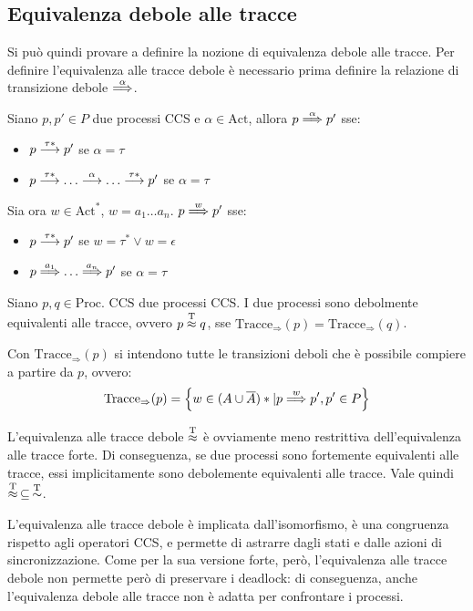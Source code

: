 \subsection*{Equivalenza debole alle tracce}
Si può quindi provare a definire la nozione di equivalenza debole alle tracce.
Per definire l'equivalenza alle tracce debole è necessario prima definire
la relazione di transizione debole $\overset{\alpha}{\Longrightarrow}$.
\begin{defn}
    Siano $p, p' \in P$ due processi CCS e $\alpha \in \text{Act}$,
    allora $p \overset{\alpha}{\Longrightarrow} p'$ sse:
    \begin{itemize}
        \item $p \overset{\tau*}{\longrightarrow} p'$ se $\alpha = \tau$
        \item $p \overset{\tau*}{\longrightarrow} \ldots \overset{\alpha}{\longrightarrow} \ldots \overset{\tau*}{\longrightarrow} p'$
        se $\alpha = \tau$
    \end{itemize}

    Sia ora $w \in \text{Act}^*$, $w = a_1 \ldots a_n$. $p \overset{w}{\Longrightarrow} p'$ sse:
    \begin{itemize}
        \item $p \overset{\tau*}{\longrightarrow} p'$ se $w = \tau^* \lor w = \epsilon$
        \item $p \overset{a_1}{\Longrightarrow} \ldots \overset{a_n}{\Longrightarrow} p'$
        se $\alpha = \tau$
    \end{itemize}
\end{defn}

\begin{defn}
    Siano $p, q \in \text{Proc. CCS}$ due processi CCS. I due processi sono
    debolmente equivalenti alle tracce, ovvero $p \overset{\textnormal{T}}{\approx} q$, sse
    $\text{Tracce}_{\Rightarrow}(p) = \text{Tracce}_{\Rightarrow}(q)$.

    Con $\text{Tracce}_{\Rightarrow}(p)$ si intendono tutte le transizioni deboli
    che è possibile compiere a partire da $p$, ovvero:
    \[
        \text{Tracce}_{\Rightarrow}(p) = \left\{w \in (A \cup \overline{A})* |
        p \overset{w}{\Longrightarrow} p', p' \in P\right\}
    \]
\end{defn}

L'equivalenza alle tracce debole $\overset{\textnormal{T}}{\approx}$ è ovviamente meno restrittiva dell'equivalenza
alle tracce forte.
Di conseguenza, se due processi sono fortemente equivalenti alle tracce,
essi implicitamente sono debolemente equivalenti alle tracce. Vale quindi
$\overset{\textnormal{T}}{\approx} \, \subseteq \, \overset{\textnormal{T}}{\sim}$.

L'equivalenza alle tracce debole è implicata dall'isomorfismo,
è una congruenza rispetto agli operatori CCS, e permette di astrarre
dagli stati e dalle azioni di sincronizzazione.
Come per la sua versione forte, però, l'equivalenza alle tracce debole non
permette però di preservare i deadlock: di conseguenza, anche l'equivalenza
debole alle tracce non è adatta per confrontare i processi.

